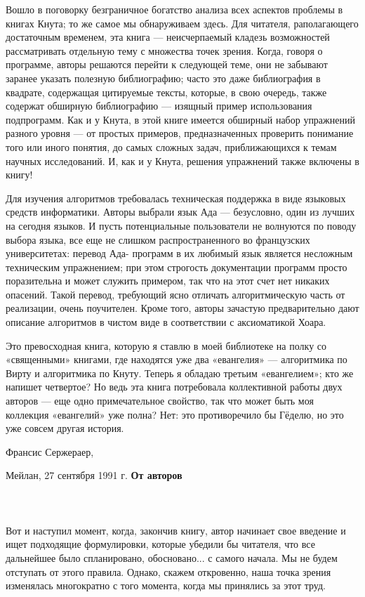 {{\pagebreak
   Вошло в поговорку безграничное богатство анализа всех аспектов проблемы в книгах Кнута; то же самое мы обнаруживаем здесь. Для читателя, раполагающего достаточным временем, эта книга — неисчерпаемый кладезь возможностей рассматривать отдельную тему с множества точек зрения. Когда, говоря о программе, авторы решаются перейти к следующей теме, они не забывают заранее указать полезную библиографию; часто это даже библиография в квадрате, содержащая цитируемые тексты, которые, в свою очередь, также содержат обширную библиографию — изящный пример использования подпрограмм. Как и у Кнута, в этой книге имеется обширный набор упражнений разного уровня — от простых примеров, предназначенных проверить понимание того или иного понятия, до самых сложных задач, приближающихся к темам научных исследований. И, как и у Кнута, решения упражнений также включены в книгу!

  Для изучения алгоритмов требовалась техническая поддержка в виде языковых средств информатики. Авторы выбрали язык Ада — безусловно, один из лучших на сегодня языков. И пусть потенциальные пользователи не волнуются по поводу выбора языка, все еще не слишком распространенного во французских университетах: перевод Ада- программ в их любимый язык является несложным техническим упражнением; при этом строгость документации программ просто поразительна и может служить примером, так что на этот счет нет никаких опасений. Такой перевод, требующий ясно отличать алгоритмическую часть от реализации, очень поучителен. Кроме того, авторы зачастую предварительно дают описание алгоритмов в чистом виде в соответствии с аксиоматикой Хоара.

   Это превосходная книга, которую я ставлю в моей библиотеке на полку со «священными» книгами, где находятся уже два «евангелия» — алгоритмика по Вирту и алгоритмика по Кнуту. Теперь я обладаю третьим «евангелием»; кто же напишет четвертое? Но ведь эта книга потребовала коллективной работы двух авторов — еще одно примечательное свойство, так что может быть моя коллекция «евангелий» уже полна? Нет: это противоречило бы Гёделю, но это уже совсем другая история.
   
\hspace{3.6in} Франсис Сержераер,

\hspace{3.1in} Мейлан, 27 сентября 1991 г.
\newpage
\cleartop
\vspace*{50pt}
\hspace{1.5in} \textbf{\Large От авторов}
\\\\\\\\
   Вот и наступил момент, когда, закончив книгу, автор начинает свое введение и ищет подходящие формулировки, которые убедили бы читателя, что все дальнейшее было спланировано, обосновано... с самого начала. Мы не будем отступать от этого правила. Однако, скажем откровенно, наша точка зрения изменялась многократно с того момента, когда мы принялись за этот труд.

}}
